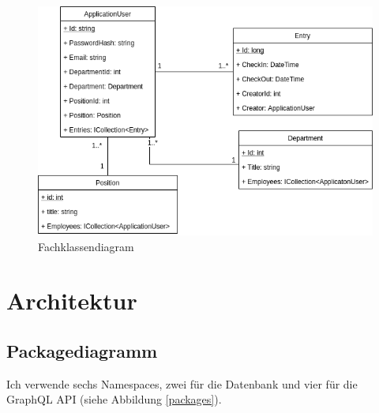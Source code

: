 \documentclass[a4paper, titlepage]{article}
\begin{document}
    \begin{figure}
        \includegraphics[width=\textwidth]{images/Fachklassendiagramm.png}
        \caption{Fachklassendiagram}
        \label{fachklassen}
    \end{figure}

    \section{Architektur}
    \subsection{Packagediagramm}
    Ich verwende sechs Namespaces, zwei für die Datenbank und vier für die
    GraphQL API (siehe Abbildung \ref{packages}).
\end{document}
